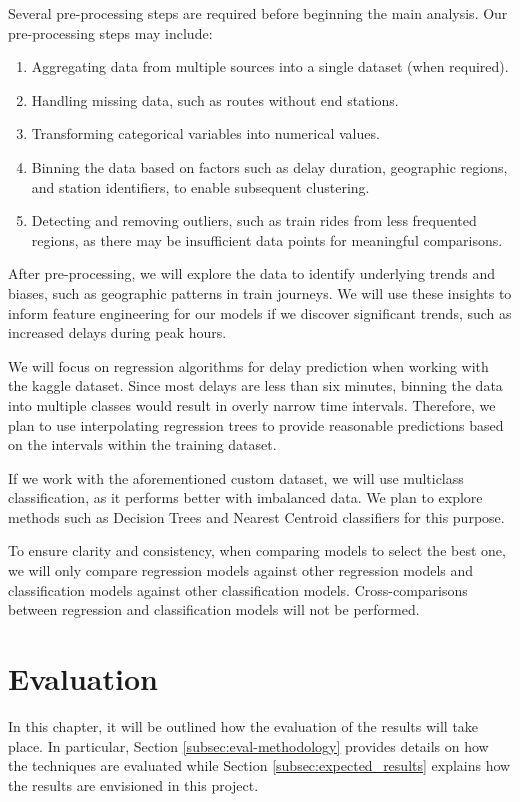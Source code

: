 \documentclass[a4paper,oneside,bibliography=totoc]{scrartcl}
\begin{document}
Several pre-processing steps are required before beginning the main analysis.
Our pre-processing steps may include:
\begin{enumerate}
    \item Aggregating data from multiple sources into a single dataset (when required).
    \item Handling missing data, such as routes without end stations.
    \item Transforming categorical variables into numerical values.
    \item Binning the data based on factors such as delay duration, geographic regions, and station identifiers,
    to enable subsequent clustering.
    \item Detecting and removing outliers, such as train rides from less frequented regions,
    as there may be insufficient data points for meaningful comparisons.
\end{enumerate}

After pre-processing, we will explore the data to identify underlying trends and biases,
such as geographic patterns in train journeys.
We will use these insights to inform feature engineering for our models if we discover significant trends,
such as increased delays during peak hours.

We will focus on regression algorithms for delay prediction when working with the kaggle dataset.
Since most delays are less than six minutes, binning the data into multiple classes would result in overly narrow time intervals.
Therefore, we plan to use interpolating regression trees to provide reasonable predictions based on the intervals within the training dataset.

If we work with the aforementioned custom dataset, we will use multiclass classification, as it performs better with imbalanced data. %
We plan to explore methods such as Decision Trees and Nearest Centroid classifiers for this purpose.

To ensure clarity and consistency, when comparing models to select the best one,
we will only compare regression models against other regression models and classification models against other classification models.
Cross-comparisons between regression and classification models will not be performed.

\section{Evaluation}\label{sec:eval}
In this chapter, it will be outlined how the evaluation of the results will take place.
In particular, Section \ref{subsec:eval-methodology} provides details on how the techniques are evaluated while Section \ref{subsec:expected_results} explains how the results are envisioned in this project.
\end{document}
